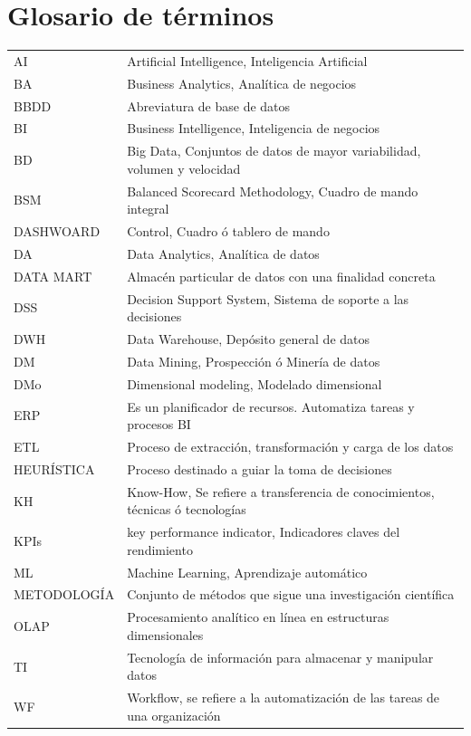 \documentclass[11pt,titlepage]{report}
\begin{document}
\section{Glosario de términos}
\begin{table}[h]
\begin{tabular}{ll}
AI\label{AI} & Artificial Intelligence, Inteligencia Artificial\\
BA\label{BA} & 	Business Analytics, Analítica de negocios\\
BBDD\label{BaseD} & Abreviatura de base de datos\\
BI\label{BI} & 	Business Intelligence, Inteligencia de negocios\\
BD\label{BD}  & Big Data, Conjuntos de datos de mayor variabilidad, volumen y velocidad\\
BSM\label{BSM} & Balanced Scorecard Methodology, Cuadro de mando integral\\
DASHWOARD\label{DW}  & Control, Cuadro ó tablero de mando\\
DA\label{DA}  & Data Analytics, Analítica de datos\\
DATA MART\label{DMart} &  Almacén particular de datos con una finalidad concreta\\
DSS\label{DSS}& Decision Support System, Sistema de soporte a las decisiones\\
DWH\label{DWH}  & Data Warehouse, Depósito general de datos\\
DM\label{DM}  & Data Mining, Prospección ó Minería de datos\\
DMo\label{DMo}  & Dimensional modeling, Modelado dimensional\\
ERP\label{ERP}  & Es un planificador de recursos. Automatiza tareas y procesos BI\\
ETL\label{ETL}  & Proceso de extracción, transformación y carga de los datos\\
HEURÍSTICA\label{HEU} & Proceso destinado a guiar la toma de decisiones\\
KH\label{KH} & Know-How,  Se refiere a transferencia de conocimientos, técnicas ó tecnologías\\
KPIs\label{KPI} &  key performance indicator, Indicadores claves del rendimiento\\
ML\label{ML} & Machine Learning, Aprendizaje automático\\
METODOLOGÍA\label{MET} &  Conjunto de métodos que sigue una investigación científica\\
OLAP\label{OLAP} &  Procesamiento analítico en línea en estructuras dimensionales\\
TI\label{TI}  &   Tecnología de información para almacenar y manipular datos\\
WF\label{WF} & Workflow, se refiere a la automatización de las tareas de una organización
\end{tabular}
\end{table}
\end{document}
